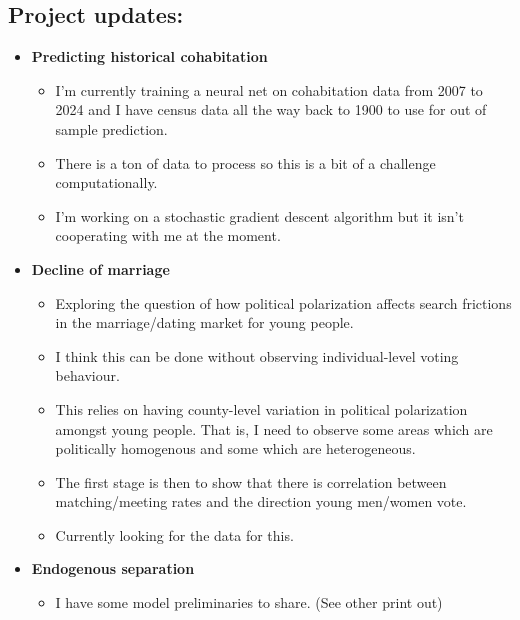 \documentclass{article}
\begin{document}
\subsection*{Project updates:}
\begin{itemize}
\item \textbf{Predicting historical cohabitation}
\begin{itemize}
\item I'm currently training a neural net on cohabitation data from 2007 to 2024 and I have census data all the way back to 1900 to use for out of sample prediction.
\item There is a ton of data to process so this is a bit of a challenge computationally.
\item I'm working on a stochastic gradient descent algorithm but it isn't cooperating with me at the moment.
\end{itemize}


\item \textbf{Decline of marriage}
\begin{itemize}
\item Exploring the question of how political polarization affects search frictions in the marriage/dating market for young people.
\item I think this can be done without observing individual-level voting behaviour. 
\item This relies on having county-level variation in political polarization amongst young people. That is, I need to observe some areas which are politically homogenous and some which are heterogeneous.
\item The first stage is then to show that there is correlation between matching/meeting rates and the direction young men/women vote. 
\item Currently looking for the data for this.
\end{itemize}

\item \textbf{Endogenous separation}
\begin{itemize}
	\item I have some model preliminaries to share. (See other print out)
\end{itemize}



\end{itemize}


\newpage

%
\end{document}
